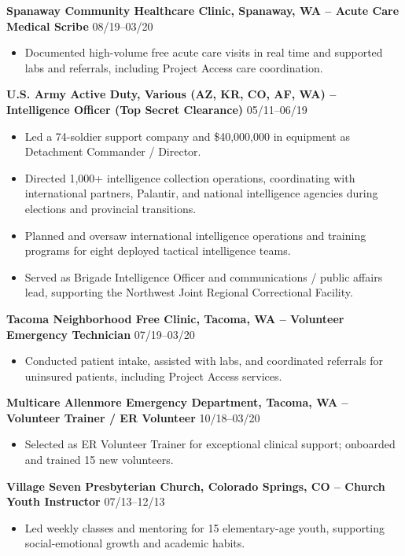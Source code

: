 \documentclass[9pt,a4paper]{article}
\newenvironment{expitemize}{%
  \begin{itemize}[leftmargin=*, topsep=0pt, itemsep=0pt, parsep=0pt, partopsep=0pt]
}{%
  \end{itemize}
}
\begin{document}
\textbf{Spanaway Community Healthcare Clinic, Spanaway, WA -- Acute Care Medical Scribe} \hfill 08/19--03/20\\[-0.25\baselineskip]
\begin{expitemize}
  \item Documented high-volume free acute care visits in real time and supported labs and referrals, including Project Access care coordination.
\end{expitemize}

\textbf{U.S. Army Active Duty, Various (AZ, KR, CO, AF, WA) -- Intelligence Officer (Top Secret Clearance)} \hfill 05/11--06/19\\[-0.25\baselineskip]
\begin{expitemize}
  \item Led a 74-soldier support company and \$40{,}000{,}000 in equipment as Detachment Commander / Director.
  \item Directed 1{,}000+ intelligence collection operations, coordinating with international partners, Palantir, and national intelligence agencies during elections and provincial transitions.
  \item Planned and oversaw international intelligence operations and training programs for eight deployed tactical intelligence teams.
  \item Served as Brigade Intelligence Officer and communications / public affairs lead, supporting the Northwest Joint Regional Correctional Facility.
\end{expitemize}

\textbf{Tacoma Neighborhood Free Clinic, Tacoma, WA -- Volunteer Emergency Technician} \hfill 07/19--03/20\\
\begin{itemize}[leftmargin=*]
  \item Conducted patient intake, assisted with labs, and coordinated referrals for uninsured patients, including Project Access services.
\end{itemize}

\textbf{Multicare Allenmore Emergency Department, Tacoma, WA -- Volunteer Trainer / ER Volunteer} \hfill 10/18--03/20\\
\begin{itemize}[leftmargin=*]
  \item Selected as ER Volunteer Trainer for exceptional clinical support; onboarded and trained 15 new volunteers.
\end{itemize}

\textbf{Village Seven Presbyterian Church, Colorado Springs, CO -- Church Youth Instructor} \hfill 07/13--12/13\\
\begin{itemize}[leftmargin=*]
  \item Led weekly classes and mentoring for 15 elementary-age youth, supporting social-emotional growth and academic habits.
\end{itemize}
\end{document}
